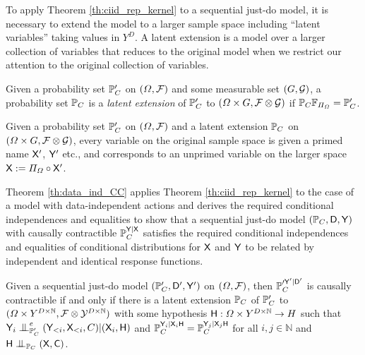 To apply Theorem \ref{th:ciid_rep_kernel} to a sequential just-do model, it is necessary to extend the model to a larger sample space including ``latent variables'' taking values in $Y^D$. A latent extension is a model over a larger collection of variables that reduces to the original model when we restrict our attention to the original collection of variables.

\begin{definition}
Given a probability set $\mathbb{P}_C'$ on $(\Omega,\mathcal{F})$ and some measurable set $(G,\mathcal{G})$, a probability set $\mathbb{P}_C$ is a \emph{latent extension} of $\mathbb{P}_C'$ to $(\Omega\times G,\mathcal{F}\otimes \mathcal{G})$ if $\mathbb{P}_C \mathbb{F}_{\Pi_{\Omega}} = \mathbb{P}_C'$.
\end{definition}

\begin{notation}
Given a probability set $\mathbb{P}_C'$ on $(\Omega,\mathcal{F})$ and a latent extension $\mathbb{P}_C$ on $(\Omega\times G,\mathcal{F}\otimes \mathcal{G})$, every variable on the original sample space is given a primed name $\mathsf{X}'$, $\mathsf{Y}'$ etc., and corresponds to an unprimed variable on the larger space $\mathsf{X}:=\Pi_\Omega\circ \mathsf{X}'$.
\end{notation}

Theorem \ref{th:data_ind_CC} applies Theorem \ref{th:ciid_rep_kernel} to the case of a model with data-independent actions and derives the required conditional independences and equalities to show that a sequential just-do model $(\mathbb{P}_C,\mathsf{D},\mathsf{Y})$ with causally contractible $\mathbb{P}_C^{\mathsf{Y}|\mathsf{X}}$ satisfies the required conditional independences and equalities of conditional distributions for $\mathsf{X}$ and $\mathsf{Y}$ to be related by independent and identical response functions.

\begin{theorem}\label{th:data_ind_CC}
Given a sequential just-do model $(\mathbb{P}_C',\mathsf{D}',\mathsf{Y}')$ on $(\Omega,\mathcal{F})$, then $\mathbb{P}_C^{\prime \mathsf{Y}'|\mathsf{D}'}$ is causally contractible if and only if there is a latent extension $\mathbb{P}_C$ of $\mathbb{P}_C'$ to $(\Omega\times Y^{D\times\mathbb{N}},\mathcal{F}\otimes\mathcal{Y}^{D\times\mathbb{N}})$ with some hypothesis $\mathsf{H}:\Omega\times Y^{D\times\mathbb{N}}\to H$ such that $\RV{Y}_i\CI^e_{\prob{P}_C'} (\RV{Y}_{<i},\RV{X}_{<i},C)|(\RV{X}_i,\RV{H})$ and $\mathbb{P}_C^{\mathsf{Y}_i|\mathsf{X}_i\mathsf{H}}=\mathbb{P}_C^{\mathsf{Y}_j|\mathsf{X}_j\mathsf{H}}$ for all $i,j\in \mathbb{N}$ and $\RV{H}\CI_{\prob{P}_C} (\RV{X},\RV{C})$.
\end{theorem}

